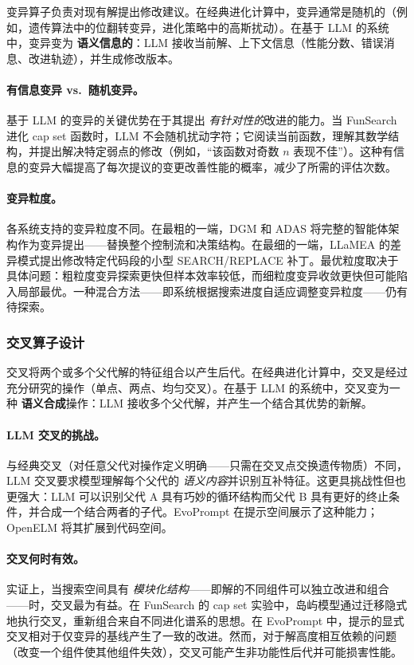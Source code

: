 变异算子负责对现有解提出修改建议。在经典进化计算中，变异通常是随机的（例如，遗传算法中的位翻转变异，进化策略中的高斯扰动）。在基于 LLM 的系统中，变异变为 \textbf{语义信息的}：LLM 接收当前解、上下文信息（性能分数、错误消息、改进轨迹），并生成修改版本。

\paragraph{有信息变异 vs.\ 随机变异。}
基于 LLM 的变异的关键优势在于其提出 \emph{有针对性的}改进的能力。当 FunSearch 进化 cap set 函数时，LLM 不会随机扰动字符；它阅读当前函数，理解其数学结构，并提出解决特定弱点的修改（例如，``该函数对奇数 $n$ 表现不佳''）。这种有信息的变异大幅提高了每次提议的变更改善性能的概率，减少了所需的评估次数。

\paragraph{变异粒度。}
各系统支持的变异粒度不同。在最粗的一端，DGM 和 ADAS 将完整的智能体架构作为变异提出——替换整个控制流和决策结构。在最细的一端，LLaMEA 的差异模式提出修改特定代码段的小型 SEARCH/REPLACE 补丁。最优粒度取决于具体问题：粗粒度变异探索更快但样本效率较低，而细粒度变异收敛更快但可能陷入局部最优。一种混合方法——即系统根据搜索进度自适应调整变异粒度——仍有待探索。

\subsubsection{交叉算子设计}

交叉将两个或多个父代解的特征组合以产生后代。在经典进化计算中，交叉是经过充分研究的操作（单点、两点、均匀交叉）。在基于 LLM 的系统中，交叉变为一种 \textbf{语义合成}操作：LLM 接收多个父代解，并产生一个结合其优势的新解。

\paragraph{LLM 交叉的挑战。}
与经典交叉（对任意父代对操作定义明确——只需在交叉点交换遗传物质）不同，LLM 交叉要求模型理解每个父代的 \emph{语义内容}并识别互补特征。这更具挑战性但也更强大：LLM 可以识别父代 A 具有巧妙的循环结构而父代 B 具有更好的终止条件，并合成一个结合两者的子代。EvoPrompt 在提示空间展示了这种能力；OpenELM 将其扩展到代码空间。

\paragraph{交叉何时有效。}
实证上，当搜索空间具有 \emph{模块化结构}——即解的不同组件可以独立改进和组合——时，交叉最为有益。在 FunSearch 的 cap set 实验中，岛屿模型通过迁移隐式地执行交叉，重新组合来自不同进化谱系的思想。在 EvoPrompt 中，提示的显式交叉相对于仅变异的基线产生了一致的改进。然而，对于解高度相互依赖的问题（改变一个组件使其他组件失效），交叉可能产生非功能性后代并可能损害性能。

